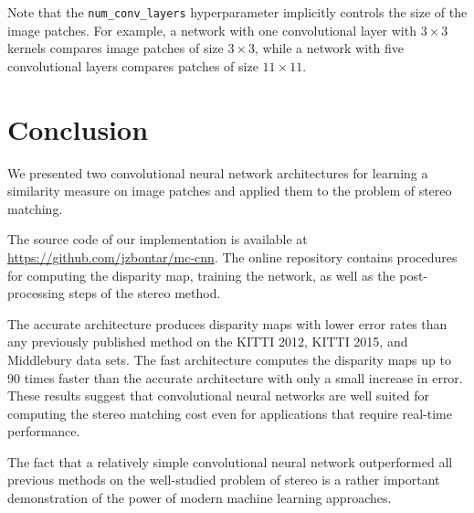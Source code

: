 \documentclass[twoside,11pt]{article}
\begin{document}
Note that the \texttt{num\_conv\_layers} hyperparameter implicitly controls
the size of the image patches. For example, a network with one convolutional
layer with \(3 \times 3\) kernels compares image patches of size \(3 \times
3\), while a network with five convolutional layers compares patches of size
\(11 \times 11\). 

\section{Conclusion}

We presented two convolutional neural network architectures for learning a
similarity measure on image patches and applied them to the problem of stereo
matching. 

The source code of our implementation is available at
\url{https://github.com/jzbontar/mc-cnn}.  The online repository contains
procedures for computing the disparity map, training the network, as well as
the post-processing steps of the stereo method.

The accurate architecture produces disparity maps with lower error rates than
any previously published method on the KITTI 2012, KITTI 2015, and Middlebury
data sets. The fast architecture computes the disparity maps up to 90 times
faster than the accurate architecture with only a small increase in error.
These results suggest that convolutional neural networks are well suited for
computing the stereo matching cost even for applications that require real-time
performance.

The fact that a relatively simple convolutional neural network outperformed all
previous methods on the well-studied problem of stereo is a rather important
demonstration of the power of modern machine learning approaches.


\end{document}
